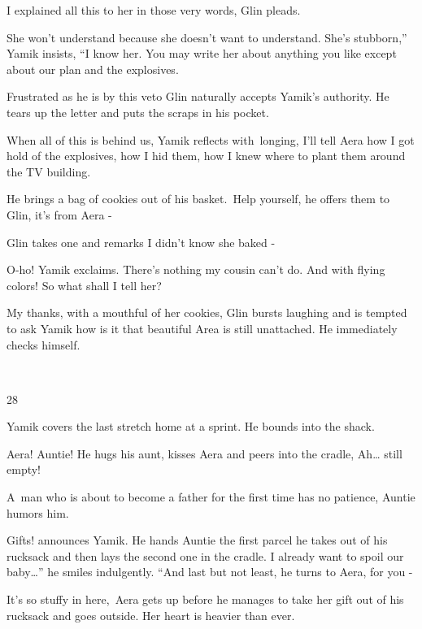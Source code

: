 \documentclass[letterpaper]{article}
\begin{document}
{\textquotedbl}I explained all this to her in those very words,{\textquotedbl} Glin pleads. 

{\textquotedbl}She won't understand because she doesn't want to understand. She's stubborn,'' Yamik insists, ``I know
her. You may write her about anything you like except about our plan and the explosives.{\textquotedbl} 

Frustrated as he is by this veto Glin naturally accepts Yamik's authority. He tears up the letter and puts the scraps in
his pocket. 

When all of this is behind us, Yamik reflects with~longing, I'll tell Aera how I got hold of the explosives, how I hid
them, how I knew where to plant them around the TV building.

He brings a bag of cookies out of his basket.\ {\textquotedbl}Help yourself,{\textquotedbl} he offers them to Glin,
{\textquotedbl}it's from Aera -{\textquotedbl} 

Glin takes one and remarks {\textquotedbl}I didn't know she baked -{\textquotedbl}

{\textquotedbl}O-ho!{\textquotedbl} Yamik exclaims. {\textquotedbl}There's nothing my cousin can't do. And with flying
colors! So what shall I tell her?{\textquotedbl} 

{\textquotedbl}My thanks, with a mouthful of her cookies,{\textquotedbl} Glin bursts laughing and is tempted to ask
Yamik how is it that beautiful Area is still unattached. He immediately checks himself.

~

28~~~~~~~~~~~~~ 

Yamik covers the last stretch home at a sprint. He bounds into the shack. 

{\textquotedbl}Aera! Auntie!{\textquotedbl} He hugs his aunt, kisses Aera and peers into the cradle,
{\textquotedbl}Ah{\dots} still empty!{\textquotedbl} 

{\textquotedbl}A~man who is about to become a father for the first time has no patience,{\textquotedbl} Auntie humors
him. 

{\textquotedbl}Gifts!{\textquotedbl} announces Yamik. He hands Auntie the first parcel he takes out of his rucksack and
then lays the second one in the cradle. {\textquotedbl}I already want to spoil our baby{\dots}'' he smiles indulgently.
``And last but not least,{\textquotedbl} he turns to Aera, {\textquotedbl}for you -{\textquotedbl}

{\textquotedbl}It's so stuffy in here,{\textquotedbl}~Aera gets up before he manages to take her gift out of his
rucksack and goes outside. Her heart is heavier than ever.
\end{document}
